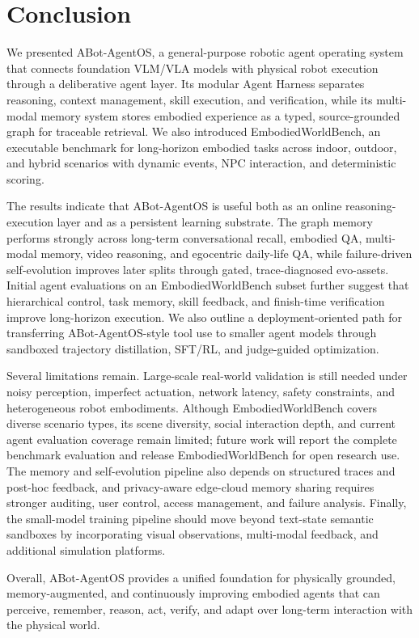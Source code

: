 
\section{Conclusion}
We presented ABot-AgentOS, a general-purpose robotic agent operating
system that connects foundation VLM/VLA models with physical robot
execution through a deliberative agent layer. Its modular Agent Harness separates
reasoning, context management, skill execution, and verification, while
its multi-modal memory system stores embodied experience as a typed,
source-grounded graph for traceable retrieval. We also introduced
EmbodiedWorldBench, an executable benchmark for long-horizon embodied
tasks across indoor, outdoor, and hybrid scenarios with dynamic events,
NPC interaction, and deterministic scoring.

The results indicate that ABot-AgentOS is useful both as an online
reasoning-execution layer and as a persistent learning substrate. The
graph memory performs strongly across long-term conversational recall,
embodied QA, multi-modal memory, video reasoning, and egocentric
daily-life QA, while failure-driven self-evolution improves later splits
through gated, trace-diagnosed evo-assets. Initial agent evaluations on
an EmbodiedWorldBench subset further suggest that hierarchical control,
task memory, skill feedback, and finish-time verification improve
long-horizon execution. We also outline a deployment-oriented path for
transferring ABot-AgentOS-style tool use to smaller agent models through
sandboxed trajectory distillation, SFT/RL, and judge-guided
optimization.

Several limitations remain. Large-scale real-world validation is still
needed under noisy perception, imperfect actuation, network latency,
safety constraints, and heterogeneous robot embodiments. Although
EmbodiedWorldBench covers diverse scenario types, its scene diversity,
social interaction depth, and current agent evaluation coverage remain
limited; future work will report the complete benchmark evaluation and
release EmbodiedWorldBench for open research use. The memory and
self-evolution pipeline also depends on structured traces and post-hoc
feedback, and privacy-aware edge-cloud memory sharing requires stronger
auditing, user control, access management, and failure analysis. Finally,
the small-model training pipeline should move beyond text-state semantic
sandboxes by incorporating visual observations, multi-modal feedback, and
additional simulation platforms.

Overall, ABot-AgentOS provides a unified foundation for physically
grounded, memory-augmented, and continuously improving embodied agents
that can perceive, remember, reason, act, verify, and adapt over
long-term interaction with the physical world.
\label{sec:conclusion}
